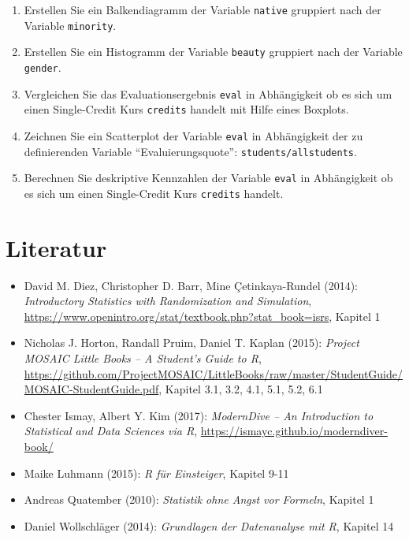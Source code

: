 \documentclass[12pt,ngerman,paper=a4,pagesize,DIV=13]{scrreprt}
\providecommand{\tightlist}{%
  \setlength{\itemsep}{0pt}\setlength{\parskip}{0pt}}
\begin{document}
\begin{enumerate}
\def\labelenumi{\arabic{enumi}.}
\tightlist
\item
  Erstellen Sie ein Balkendiagramm der Variable \texttt{native}
  gruppiert nach der Variable \texttt{minority}.
\item
  Erstellen Sie ein Histogramm der Variable \texttt{beauty} gruppiert
  nach der Variable \texttt{gender}.
\item
  Vergleichen Sie das Evaluationsergebnis \texttt{eval} in Abhängigkeit
  ob es sich um einen Single-Credit Kurs \texttt{credits} handelt mit
  Hilfe eines Boxplots.
\item
  Zeichnen Sie ein Scatterplot der Variable \texttt{eval} in
  Abhängigkeit der zu definierenden Variable
  \enquote{Evaluierungsquote}: \texttt{students/allstudents}.
\item
  Berechnen Sie deskriptive Kennzahlen der Variable \texttt{eval} in
  Abhängigkeit ob es sich um einen Single-Credit Kurs \texttt{credits}
  handelt.
\end{enumerate}

\hypertarget{literatur-1}{%
\section{Literatur}\label{literatur-1}}

\begin{itemize}
\tightlist
\item
  David M. Diez, Christopher D. Barr, Mine Çetinkaya-Rundel (2014):
  \emph{Introductory Statistics with Randomization and Simulation},
  \url{https://www.openintro.org/stat/textbook.php?stat_book=isrs},
  Kapitel 1
\item
  Nicholas J. Horton, Randall Pruim, Daniel T. Kaplan (2015):
  \emph{Project MOSAIC Little Books -- A Student's Guide to R},
  \url{https://github.com/ProjectMOSAIC/LittleBooks/raw/master/StudentGuide/MOSAIC-StudentGuide.pdf},
  Kapitel 3.1, 3.2, 4.1, 5.1, 5.2, 6.1
\item
  Chester Ismay, Albert Y. Kim (2017): \emph{ModernDive -- An
  Introduction to Statistical and Data Sciences via R},
  \url{https://ismayc.github.io/moderndiver-book/}
\item
  Maike Luhmann (2015): \emph{R für Einsteiger}, Kapitel 9-11
\item
  Andreas Quatember (2010): \emph{Statistik ohne Angst vor Formeln},
  Kapitel 1
\item
  Daniel Wollschläger (2014): \emph{Grundlagen der Datenanalyse mit R},
  Kapitel 14
\end{itemize}
\end{document}
